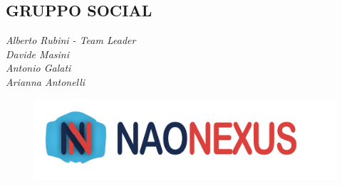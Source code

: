 \documentclass{optica-article}
\begin{document}
\bigskip

\subsection{GRUPPO SOCIAL}

\noindent\emph{Alberto Rubini - Team Leader}\\
\emph{Davide Masini}\\
\emph{Antonio Galati}\\
\emph{Arianna Antonelli}\\


\begin{figure}[b]
    \centering
    \includegraphics[scale=0.04]{figures/logo.png}
    \label{fig:logo_con_scritta1}
\end{figure}


\end{document}
